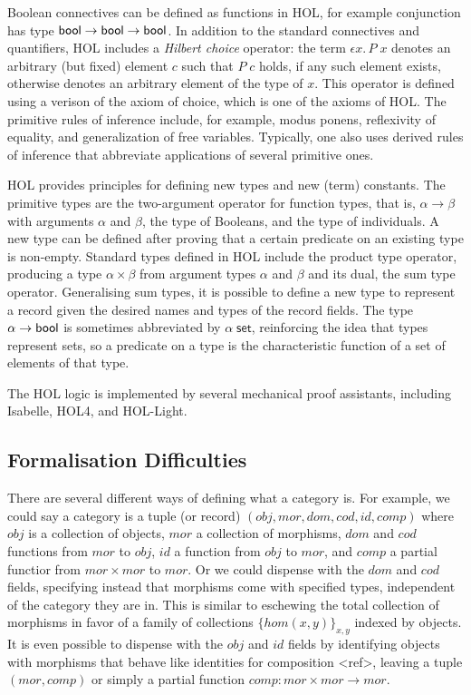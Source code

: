 \documentclass[twoside,titlepage,11pt]{article}
\begin{document}
Boolean connectives can be defined as functions in HOL, for example conjunction has type $\mathsf{bool}\to\mathsf{bool}\to\mathsf{bool}$.
In addition to the standard connectives and quantifiers, HOL includes a \emph{Hilbert choice} operator: the term $\epsilon{x}.\,P\; x$ denotes an arbitrary (but fixed) element $c$ such that $P\; c$ holds, if any such element exists, otherwise denotes an arbitrary element of the type of $x$.
This operator is defined using a verison of the axiom of choice, which is one of the axioms of HOL.
The primitive rules of inference include, for example, modus ponens, reflexivity of equality, and generalization of free variables.
Typically, one also uses derived rules of inference that abbreviate applications of several primitive ones.

HOL provides principles for defining new types and new (term) constants.
The primitive types are the two-argument operator for function types, that is, $\alpha\to\beta$ with arguments $\alpha$ and $\beta$, the type of Booleans, and the type of individuals.
A new type can be defined after proving that a certain predicate on an existing type is non-empty.
Standard types defined in HOL include the product type operator, producing a type $\alpha\times\beta$ from argument types $\alpha$ and $\beta$ and its dual, the sum type operator.
Generalising sum types, it is possible to define a new type to represent a record given the desired names and types of the record fields.
The type $\alpha\to\mathsf{bool}$ is sometimes abbreviated by $\alpha\;\mathsf{set}$, reinforcing the idea that types represent sets, so a predicate on a type is the characteristic function of a set of elements of that type. 

The HOL logic is implemented by several mechanical proof assistants, including Isabelle, HOL4, and HOL-Light.
\subsection{Formalisation Difficulties}%
There are several different ways of defining what a category is.
For example, we could say a category is a tuple (or record) $(obj,mor,dom,cod,id,comp)$ where $obj$ is a collection of objects, $mor$ a collection of morphisms, $dom$ and $cod$ functions from $mor$ to $obj$, $id$ a function from $obj$ to $mor$, and $comp$ a partial functior from $mor\times mor$ to $mor$.
Or we could dispense with the $dom$ and $cod$ fields, specifying instead that morphisms come with specified types, independent of the category they are in.
This is similar to eschewing the total collection of morphisms in favor of a family of collections $\{hom(x,y)\}_{x,y}$ indexed by objects.
It is even possible to dispense with the $obj$ and $id$ fields by identifying objects with morphisms that behave like identities for composition <ref>, leaving a tuple $(mor,comp)$ or simply a partial function $comp:mor\times mor\to mor$.
\end{document}
